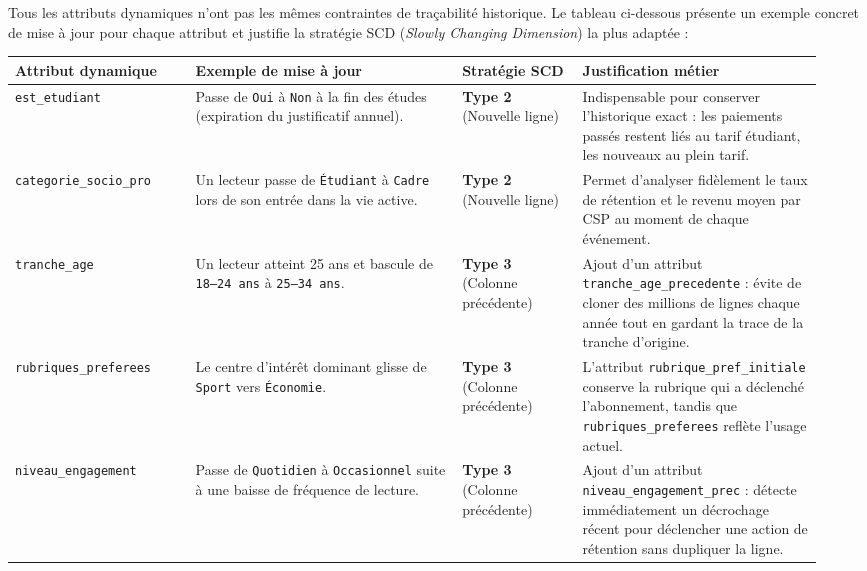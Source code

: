 \documentclass[a4paper,12pt]{article}
\begin{document}
Tous les attributs dynamiques n'ont pas les mêmes contraintes de traçabilité historique. Le tableau ci-dessous présente un exemple concret de mise à jour pour chaque attribut et justifie la stratégie SCD (\emph{Slowly Changing Dimension}) la plus adaptée :

\begin{center}
\footnotesize
\setlength{\tabcolsep}{4pt}
\renewcommand{\arraystretch}{1.25}
\begin{tabular}{@{}p{0.21\linewidth}p{0.31\linewidth}p{0.14\linewidth}p{0.28\linewidth}@{}}
  \toprule
  \textbf{Attribut dynamique} & \textbf{Exemple de mise à jour} & \textbf{Stratégie SCD} & \textbf{Justification métier} \\
  \midrule
  \texttt{est\_etudiant} & Passe de \texttt{Oui} à \texttt{Non} à la fin des études (expiration du justificatif annuel). & \textbf{Type 2} \newline (Nouvelle ligne) & Indispensable pour conserver l'historique exact : les paiements passés restent liés au tarif étudiant, les nouveaux au plein tarif. \\
  \addlinespace
  \texttt{categorie\_socio\_pro} & Un lecteur passe de \texttt{Étudiant} à \texttt{Cadre} lors de son entrée dans la vie active. & \textbf{Type 2} \newline (Nouvelle ligne) & Permet d'analyser fidèlement le taux de rétention et le revenu moyen par CSP au moment de chaque événement. \\
  \addlinespace
  \texttt{tranche\_age} & Un lecteur atteint 25 ans et bascule de \texttt{18--24 ans} à \texttt{25--34 ans}. & \textbf{Type 3} \newline (Colonne précédente) & Ajout d'un attribut \texttt{tranche\_age\_precedente} : évite de cloner des millions de lignes chaque année tout en gardant la trace de la tranche d'origine. \\
  \addlinespace
  \texttt{rubriques\_preferees} & Le centre d'intérêt dominant glisse de \texttt{Sport} vers \texttt{Économie}. & \textbf{Type 3} \newline (Colonne précédente) & L'attribut \texttt{rubrique\_pref\_initiale} conserve la rubrique qui a déclenché l'abonnement, tandis que \texttt{rubriques\_preferees} reflète l'usage actuel. \\
  \addlinespace
  \texttt{niveau\_engagement} & Passe de \texttt{Quotidien} à \texttt{Occasionnel} suite à une baisse de fréquence de lecture. & \textbf{Type 3} \newline (Colonne précédente) & Ajout d'un attribut \texttt{niveau\_engagement\_prec} : détecte immédiatement un décrochage récent pour déclencher une action de rétention sans dupliquer la ligne. \\

\end{tabular}
\end{center}
\end{document}
